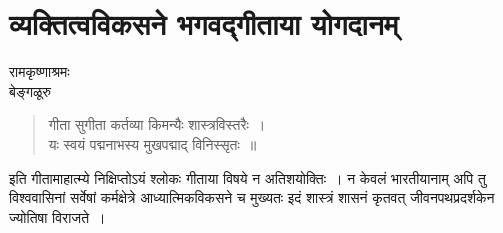 {\fontsize{15}{17}\selectfont
\presetvalues
\chapter{व्यक्तित्वविकसने भगवद्गीताया योगदानम्}

\begin{center}
\smallskip
रामकृष्णाश्रमः\\
बेङ्गळूरु
\addrule
\end{center}

\begin{verse}
गीता सुगीता कर्तव्या किमन्यैः शास्त्रविस्तरैः~। \\
यः स्वयं पद्मनाभस्य मुखपद्माद् विनिस्सृतः~॥
\end{verse}
इति गीतामाहात्म्ये निक्षिप्तोऽयं श्लोकः गीताया विषये न अतिशयोक्तिः~। न केवलं भारतीयानाम् अपि तु विश्ववासिनां सर्वेषां कर्मक्षेत्रे आध्यात्मिकविकसने च मुख्यतः इदं शास्त्रं शासनं कृतवत् जीवनपथप्रदर्शकेन ज्योतिषा विराजते~। 

}
